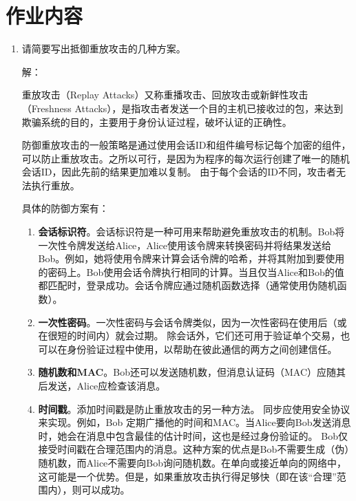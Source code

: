\documentclass[degree=project,degree-type=project,cjk-font=noto]{thuthesis}
\begin{document}
\maketitle

\frontmatter
% 



\mainmatter

\chapter{作业内容}

\begin{enumerate}
  \setlength{\itemsep}{3\parskip}
  \item 请简要写出抵御重放攻击的几种方案。

  {\heiti 解：}

  重放攻击（Replay Attacks）又称重播攻击、回放攻击或新鲜性攻击（Freshness Attacks），是指攻击者发送一个目的主机已接收过的包，来达到欺骗系统的目的，主要用于身份认证过程，破坏认证的正确性。

  防御重放攻击的一般策略是通过使用会话ID和组件编号标记每个加密的组件，可以防止重放攻击。之所以可行，是因为为程序的每次运行创建了唯一的随机会话ID，因此先前的结果更加难以复制。 由于每个会话的ID不同，攻击者无法执行重放。

  具体的防御方案有：

  \begin{enumerate}
    \item \textbf{会话标识符}。会话标识符是一种可用来帮助避免重放攻击的机制。Bob将一次性令牌发送给Alice，Alice使用该令牌来转换密码并将结果发送给Bob。例如，她将使用令牌来计算会话令牌的哈希，并将其附加到要使用的密码上。Bob使用会话令牌执行相同的计算。当且仅当Alice和Bob的值都匹配时，登录成功。会话令牌应通过随机函数选择（通常使用伪随机函数）。 
    \item \textbf{一次性密码}。一次性密码与会话令牌类似，因为一次性密码在使用后（或在很短的时间内）就会过期。 除会话外，它们还可用于验证单个交易，也可以在身份验证过程中使用，以帮助在彼此通信的两方之间创建信任。
    \item \textbf{随机数和MAC}。Bob还可以发送随机数，但消息认证码（MAC）应随其后发送，Alice应检查该消息。
    \item \textbf{时间戳}。添加时间戳是防止重放攻击的另一种方法。 同步应使用安全协议来实现。例如，Bob 定期广播他的时间和MAC。当Alice要向Bob发送消息时，她会在消息中包含最佳的估计时间，这也是经过身份验证的。 Bob仅接受时间戳在合理范围内的消息。这种方案的优点是Bob不需要生成（伪）随机数，而Alice不需要向Bob询问随机数。在单向或接近单向的网络中，这可能是一个优势。但是，如果重放攻击执行得足够快（即在该“合理”范围内），则可以成功。
\end{enumerate}


\end{enumerate}
\end{document}

